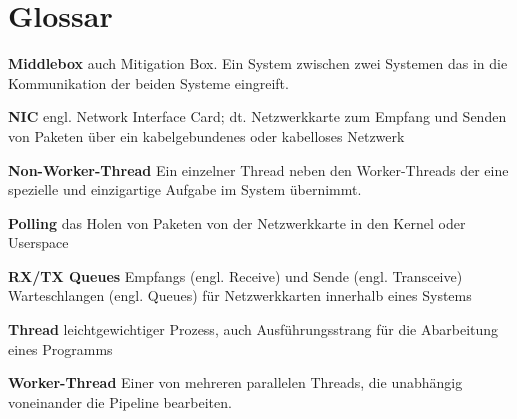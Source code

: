 \documentclass[../review_3.tex]{subfiles}
\begin{document}
\chapter{Glossar}\thispagestyle{fancy}

\begin{description}
    \item \textbf{Middlebox} auch Mitigation Box. Ein System zwischen zwei Systemen das in die Kommunikation der beiden Systeme eingreift.
    \item \textbf{NIC} engl. Network Interface Card; dt. Netzwerkkarte zum Empfang und Senden von Paketen über ein kabelgebundenes oder kabelloses Netzwerk
    \item \textbf{Non-Worker-Thread} Ein einzelner Thread neben den Worker-Threads der eine spezielle und einzigartige Aufgabe im System übernimmt.
    \item \textbf{Polling} das Holen von Paketen von der Netzwerkkarte in den Kernel oder Userspace
    \item \textbf{RX/TX Queues} Empfangs (engl. Receive) und Sende (engl. Transceive) Warteschlangen (engl. Queues) für Netzwerkkarten innerhalb eines Systems
    \item \textbf{Thread} leichtgewichtiger Prozess, auch Ausführungsstrang für die Abarbeitung eines Programms
    \item \textbf{Worker-Thread} Einer von mehreren parallelen Threads, die unabhängig voneinander die Pipeline bearbeiten.

\end{description}
\end{document}
